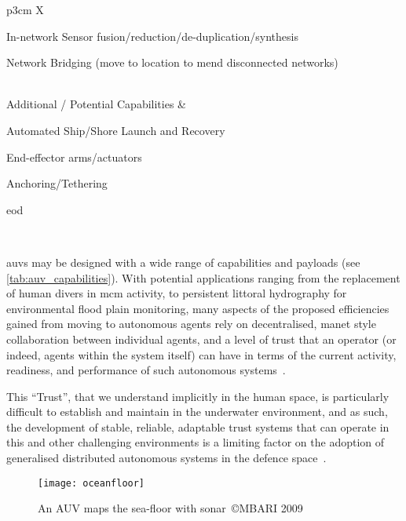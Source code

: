 \begin{table}
\begin{tabularx}{\textwidth}{p{3cm} X}
\begin{minipage}[t]{\linewidth}
\begin{tightimize}
				\item In-network Sensor fusion/reduction/de-duplication/synthesis
				\item Network Bridging (move to location to mend disconnected networks)
			\end{tightimize}
		\end{minipage}\\\midrule
		Additional / Potential Capabilities  &  
		\begin{minipage}[t]{\linewidth}
			\begin{tightimize}
				\item Automated Ship/Shore Launch and Recovery
				\item End-effector arms/actuators
				\item Anchoring/Tethering
				\item \acrfull{eod}
			\end{tightimize}
		\end{minipage}\\ \bottomrule
	\end{tabularx}
\end{table}

\glspl{auv} may be designed with a wide range of capabilities and payloads (see \autoref{tab:auv_capabilities}). With potential applications ranging from the replacement of human divers in \gls{mcm} activity, to persistent littoral hydrography for environmental flood plain monitoring, many aspects of the proposed efficiencies gained from moving to autonomous agents rely on decentralised, \gls{manet} style collaboration between individual agents, and a level of trust that an operator (or indeed, agents within the system itself) can have in terms of the current activity, readiness, and performance of such autonomous systems~\cite{Wynn2014}.

This ``Trust'', that we understand implicitly in the human space, is particularly difficult to establish and maintain in the underwater environment, and as such, the development of stable, reliable, adaptable trust systems that can operate in this and other challenging environments is a limiting factor on the adoption of generalised distributed autonomous systems in the defence space~\cite{Caseley2009}.

\begin{figure}[h]
	\centering
	\texttt{[image: oceanfloor]}
	\caption{An AUV maps the sea-floor with sonar~\copyright MBARI 2009}
\end{figure}

